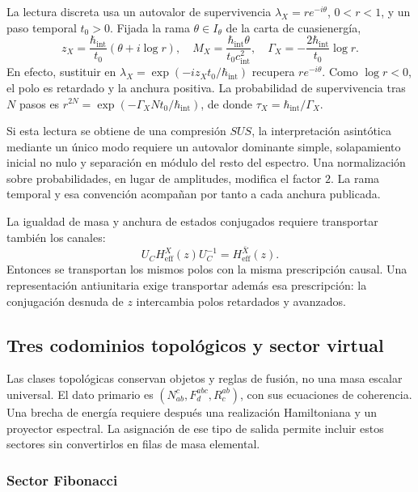 La lectura discreta usa un autovalor de supervivencia
\(\lambda_X=re^{-i\theta}\), \(0<r<1\), y un paso temporal
\(t_0>0\). Fijada la rama \(\theta\in I_\theta\) de la carta de
cuasienergía,
\begin{equation}
 z_X=\frac{\hbar_{\mathrm{int}}}{t_0}
 (\theta+i\log r),\quad
 M_X=\frac{\hbar_{\mathrm{int}}\theta}{t_0c_{\mathrm{int}}^2},\quad
 \Gamma_X=-\frac{2\hbar_{\mathrm{int}}}{t_0}\log r.
 \label{vi:vi:eq:anchura-discreta-familias}
\end{equation}
En efecto, sustituir en
\(\lambda_X=\exp(-iz_Xt_0/\hbar_{\mathrm{int}})\) recupera
\(re^{-i\theta}\). Como \(\log r<0\), el polo es retardado y la
anchura positiva. La probabilidad de supervivencia tras \(N\) pasos es
\(r^{2N}=\exp(-\Gamma_XNt_0/\hbar_{\mathrm{int}})\), de donde
\(\tau_X=\hbar_{\mathrm{int}}/\Gamma_X\).

Si esta lectura se obtiene de una compresión \(SUS\), la interpretación
asintótica mediante un único modo requiere un autovalor dominante
simple, solapamiento inicial no nulo y separación en módulo del resto
del espectro. Una normalización sobre probabilidades, en lugar de
amplitudes, modifica el factor \(2\). La rama temporal y esa convención
acompañan por tanto a cada anchura publicada.

La igualdad de masa y anchura de estados conjugados requiere transportar
también los canales:
\[
 U_C H_{\mathrm{eff}}^X(z)U_C^{-1}=H_{\mathrm{eff}}^{\bar X}(z).
\]
Entonces se transportan los mismos polos con la misma prescripción
causal. Una representación antiunitaria exige transportar además esa
prescripción: la conjugación desnuda de \(z\) intercambia polos
retardados y avanzados.

\subsection{Tres codominios topológicos y sector virtual}
\label{vi:vi:subsec:topologicos-familias}

Las clases topológicas conservan objetos y reglas de fusión, no una
masa escalar universal. El dato primario es
\((N_{ab}^{c},F^{abc}_d,R^{ab}_c)\), con sus ecuaciones de coherencia.
Una brecha de energía requiere después una realización Hamiltoniana y
un proyector espectral. La asignación de ese tipo de salida permite
incluir estos sectores sin convertirlos en filas de masa elemental.

\subsubsection{Sector Fibonacci}

